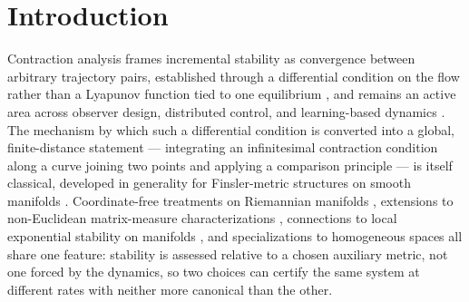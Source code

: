 \documentclass[preprint,12pt,authoryear]{elsarticle}
\begin{document}
%

\section{Introduction}
\label{sec:intro}

Contraction analysis frames incremental stability as convergence between arbitrary trajectory pairs, established through a differential condition on the flow rather than a Lyapunov function tied to one equilibrium \cite{lohmiller1998contraction}, and remains an active area across observer design, distributed control, and learning-based dynamics \cite{tsukamoto2021contraction,davydov2024perspectives}. The mechanism by which such a differential condition is converted into a global, finite-distance statement --- integrating an infinitesimal contraction condition along a curve joining two points and applying a comparison principle --- is itself classical, developed in generality for Finsler-metric structures on smooth manifolds \cite{forni2014differential}. Coordinate-free treatments on Riemannian manifolds \cite{simpsonporco2014riemannian}, extensions to non-Euclidean matrix-measure characterizations \cite{davydov2022noneuclidean}, connections to local exponential stability on manifolds \cite{wu2024stability}, and specializations to homogeneous spaces \cite{harapanahalli2024coordinatefree} all share one feature: stability is assessed relative to a chosen auxiliary metric, not one forced by the dynamics, so two choices can certify the same system at different rates with neither more canonical than the other.
\end{document}
